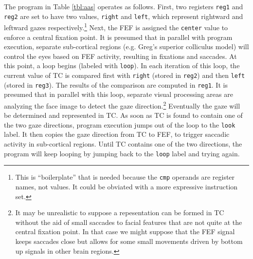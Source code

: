 \documentclass[pdftex,12pt,letterpaper]{article}
\begin{document}
The program in Table \ref{tbl:aas} operates as follows.  First, two registers \texttt{reg1} and \texttt{reg2} are set to have two values, \texttt{right} and \texttt{left}, which represent rightward and leftward gazes respectively.\footnote{This is ``boilerplate'' that is needed because the \texttt{cmp} operands are register names, not values.  It could be obviated with a more expressive instruction set.}  Next, the FEF is assigned the \texttt{center} value to enforce a central fixation point.  It is presumed that in parallel with program execution, separate sub-cortical regions (e.g. Greg's superior colliculus model) will control the eyes based on FEF activity, resulting in fixations and saccades.  At this point, a loop begins (labeled with \texttt{loop}).  In each iteration of this loop, the current value of TC is compared first with \texttt{right} (stored in \texttt{reg2}) and then \texttt{left} (stored in \texttt{reg3}).  The results of the comparison are computed in \texttt{reg1}.  It is presumed that in parallel with this loop, separate visual processing areas are analyzing the face image to detect the gaze direction.\footnote{It may be unrealistic to suppose a repesentation can be formed in TC without the aid of small saccades to facial features that are not quite at the central fixation point.  In that case we might suppose that the FEF signal keeps saccades close but allows for some small movements driven by bottom up signals in other brain regions.}  Eventually the gaze will be determined and represented in TC.  As soon as TC is found to contain one of the two gaze directions, program execution jumps out of the loop to the \texttt{look} label.  It then copies the gaze direction from TC to FEF, to trigger saccadic activity in sub-cortical regions.  Until TC contains one of the two directions, the program will keep looping by jumping back to the \texttt{loop} label and trying again.
\end{document}
